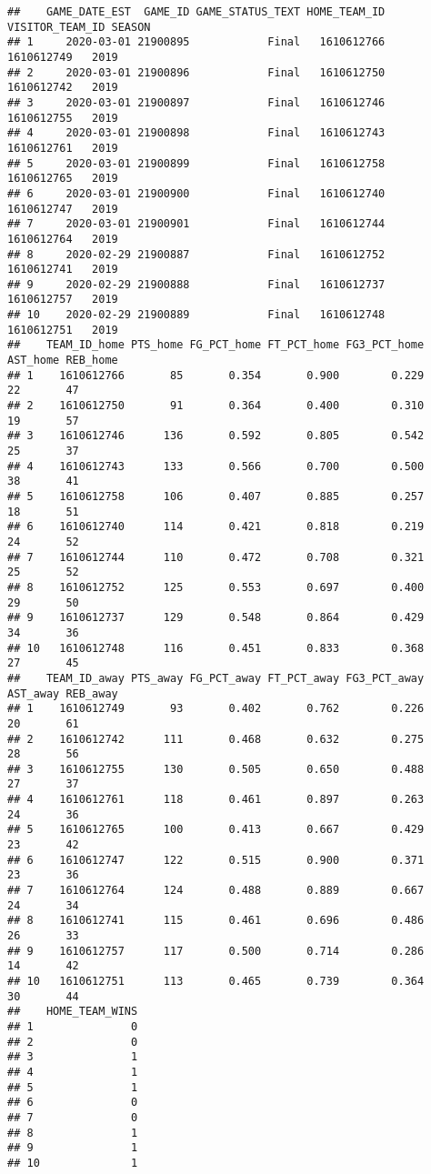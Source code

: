 \documentclass[
]{article}
\begin{document}
\begin{verbatim}
##    GAME_DATE_EST  GAME_ID GAME_STATUS_TEXT HOME_TEAM_ID VISITOR_TEAM_ID SEASON
## 1     2020-03-01 21900895            Final   1610612766      1610612749   2019
## 2     2020-03-01 21900896            Final   1610612750      1610612742   2019
## 3     2020-03-01 21900897            Final   1610612746      1610612755   2019
## 4     2020-03-01 21900898            Final   1610612743      1610612761   2019
## 5     2020-03-01 21900899            Final   1610612758      1610612765   2019
## 6     2020-03-01 21900900            Final   1610612740      1610612747   2019
## 7     2020-03-01 21900901            Final   1610612744      1610612764   2019
## 8     2020-02-29 21900887            Final   1610612752      1610612741   2019
## 9     2020-02-29 21900888            Final   1610612737      1610612757   2019
## 10    2020-02-29 21900889            Final   1610612748      1610612751   2019
##    TEAM_ID_home PTS_home FG_PCT_home FT_PCT_home FG3_PCT_home AST_home REB_home
## 1    1610612766       85       0.354       0.900        0.229       22       47
## 2    1610612750       91       0.364       0.400        0.310       19       57
## 3    1610612746      136       0.592       0.805        0.542       25       37
## 4    1610612743      133       0.566       0.700        0.500       38       41
## 5    1610612758      106       0.407       0.885        0.257       18       51
## 6    1610612740      114       0.421       0.818        0.219       24       52
## 7    1610612744      110       0.472       0.708        0.321       25       52
## 8    1610612752      125       0.553       0.697        0.400       29       50
## 9    1610612737      129       0.548       0.864        0.429       34       36
## 10   1610612748      116       0.451       0.833        0.368       27       45
##    TEAM_ID_away PTS_away FG_PCT_away FT_PCT_away FG3_PCT_away AST_away REB_away
## 1    1610612749       93       0.402       0.762        0.226       20       61
## 2    1610612742      111       0.468       0.632        0.275       28       56
## 3    1610612755      130       0.505       0.650        0.488       27       37
## 4    1610612761      118       0.461       0.897        0.263       24       36
## 5    1610612765      100       0.413       0.667        0.429       23       42
## 6    1610612747      122       0.515       0.900        0.371       23       36
## 7    1610612764      124       0.488       0.889        0.667       24       34
## 8    1610612741      115       0.461       0.696        0.486       26       33
## 9    1610612757      117       0.500       0.714        0.286       14       42
## 10   1610612751      113       0.465       0.739        0.364       30       44
##    HOME_TEAM_WINS
## 1               0
## 2               0
## 3               1
## 4               1
## 5               1
## 6               0
## 7               0
## 8               1
## 9               1
## 10              1
\end{verbatim}
\end{document}
